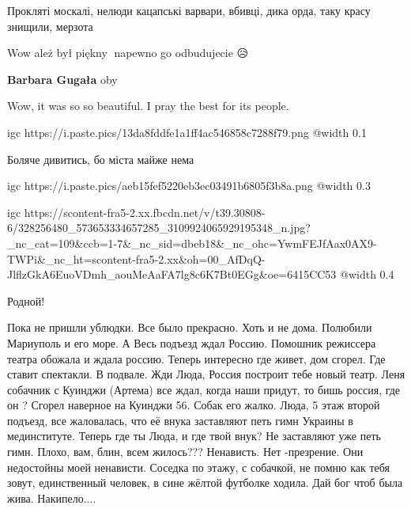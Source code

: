 
Прокляті москалі, нелюди кацапські варвари, вбивці, дика орда, таку красу знищили, мерзота


Wow ależ był piękny🤩 napewno go odbudujecie 😥👍🏻

\begin{itemize} %
\textbf{Barbara Gugała} oby
\end{itemize} %


Wow, it was so so beautiful. I pray the best for its people.


\ifcmt
  igc https://i.paste.pics/13da8fddfe1a1ff4ac546858c7288f79.png
	@width 0.1
\fi


Боляче дивитись, бо міста майже нема


\ifcmt
  igc https://i.paste.pics/aeb15fef5220eb3ec03491b6805f3b8a.png
	@width 0.3
\fi


\ifcmt
  igc https://scontent-fra5-2.xx.fbcdn.net/v/t39.30808-6/328256480_573653334657285_3109924065929195348_n.jpg?_nc_cat=109&ccb=1-7&_nc_sid=dbeb18&_nc_ohc=YwmFEJfAax0AX9-TWPi&_nc_ht=scontent-fra5-2.xx&oh=00_AfDqQ-JlflzGkA6EuoVDmh_aouMeAaFA7lg8c6K7Bt0EGg&oe=6415CC53
	@width 0.4
\fi


Родной!


Пока не пришли ублюдки. Все было прекрасно. Хоть и не дома. Полюбили Мариуполь
и его море. А Весь подъезд ждал Россию. Помошник режиссера театра обожала и
ждала россию. Теперь интересно где живет, дом сгорел. Где ставит спектакли. В
подвале. Жди Люда, Россия построит тебе новый театр. Леня собачник с
Куинджи (Артема) все ждал, когда наши придут, то бишь россия, где он ? Сгорел
наверное на Куинджи 56. Собак его жалко. Люда, 5 этаж второй подъезд, все
жаловалась, что её внука заставляют петь гимн Украины в мединституте. Теперь
где ты Люда, и где твой внук? Не заставляют уже петь гимн. Плохо, вам, блин,
всем жилось??? Ненависть. Нет -презрение. Они недостойны моей ненависти.
Соседка по этажу, с собачкой, не помню как тебя зовут, единственный человек,
в сине жёлтой футболке ходила. Дай бог чтоб была жива. Накипело....

